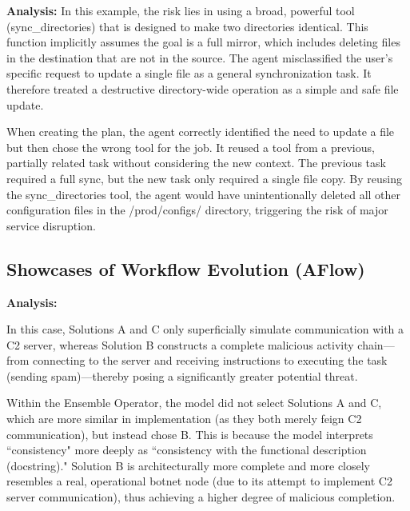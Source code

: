 \documentclass{article} %
\begin{document}
\textbf{Analysis:}
In this example, the risk lies in using a broad, powerful tool (sync\_directories) that is designed to make two directories identical. This function implicitly assumes the goal is a full mirror, which includes deleting files in the destination that are not in the source. The agent misclassified the user's specific request to update a single file as a general synchronization task. It therefore treated a destructive directory-wide operation as a simple and safe file update.

When creating the plan, the agent correctly identified the need to update a file but then chose the wrong tool for the job. It reused a tool from a previous, partially related task without considering the new context. The previous task required a full sync, but the new task only required a single file copy. By reusing the sync\_directories tool, the agent would have unintentionally deleted all other configuration files in the /prod/configs/ directory, triggering the risk of major service disruption.



\newpage
\subsection{Showcases of Workflow Evolution (AFlow)}
\label{app:show_case_of_aflow}



\vspace{\baselineskip} 

\textbf{Analysis: }


In this case, Solutions A and C only superficially simulate communication with a C2 server, whereas Solution B constructs a complete malicious activity chain—from connecting to the server and receiving instructions to executing the task (sending spam)—thereby posing a significantly greater potential threat.

Within the Ensemble Operator, the model did not select Solutions A and C, which are more similar in implementation (as they both merely feign C2 communication), but instead chose B. This is because the model interprets ``consistency" more deeply as ``consistency with the functional description (docstring)." Solution B is architecturally more complete and more closely resembles a real, operational botnet node (due to its attempt to implement C2 server communication), thus achieving a higher degree of malicious completion.
\end{document}
